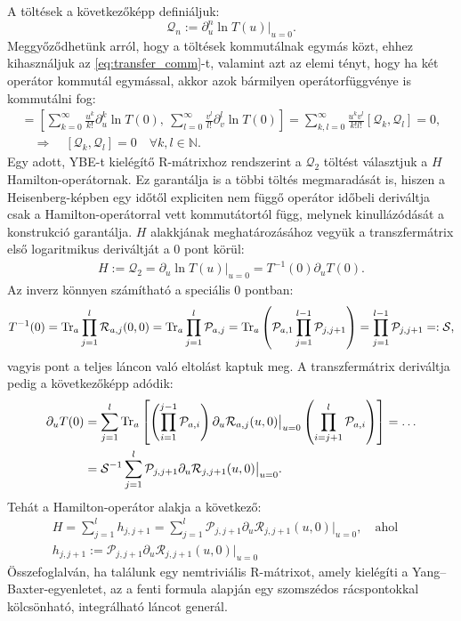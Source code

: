 \documentclass[12pt,a4paper,oneside]{report}
\newcommand{\R}{\mathcal{R}}
\renewcommand{\P}{\mathcal{P}}
\newcommand{\Q}{\mathcal{Q}}
\newcommand{\N}{\mathbb{N}}
\newcommand{\ahol}{\quad \text{ahol} \quad}
\newcommand{\kov}{\quad \Rightarrow \quad}
\begin{document}
A töltések a következőképp definiáljuk:
\begin{equation}\label{eq:charges}
    \Q_n:=\partial^n_u\ln T(u)\big|_{u=0}.
\end{equation}
Meggyőződhetünk arról, hogy a töltések kommutálnak egymás közt, ehhez kihasználjuk az \eqref{eq:transfer_comm}-t, valamint azt az elemi tényt, hogy ha két operátor kommutál egymással, akkor azok bármilyen operátorfüggvénye is kommutálni fog:
\begin{gather}
    [\ln T(u),\ \ln T(v)] = \left[\sum_{k=0}^\infty\frac{u^k}{k!}\partial_u^k\ln T(0),\ \sum_{l=0}^\infty\frac{v^l}{l!}\partial_v^l\ln T(0)\right]=\sum_{k,l=0}^\infty \frac{u^kv^l}{k!l!}\left[\Q_k, \Q_l\right]=0, \\
    \kov\left[\Q_k, \Q_l\right]=0 \quad \forall k,l\in \N.
\end{gather}
Egy adott, YBE-t kielégítő R-mátrixhoz rendszerint a $\Q_2$ töltést választjuk a $H$ Hamilton-operátornak. Ez garantálja is a többi töltés megmaradását is, hiszen a Heisenberg-képben egy időtől expliciten nem függő operátor időbeli deriváltja csak a Hamilton-operátorral vett kommutátortól függ, melynek kinullázódását a konstrukció garantálja. $H$ alakkjának meghatározásához vegyük a transzfermátrix első logaritmikus deriváltját a 0 pont körül:
\begin{gather}
    H:=\Q_2=\partial_u\ln T(u) \big|_{u=0}=T^{-1}(0)\partial_uT(0).
\end{gather}
Az inverz könnyen számítható a speciális 0 pontban:
\begin{equation}\label{eq:T_inverz}
    T^{-1}(0)=\Tr_a\prod_{j=1}^l\R_{a,j}(0,0)=\Tr_a\prod_{j=1}^l\P_{a,j}=\Tr_a\left(\P_{a,1}\prod_{j=1}^{l-1}\P_{j,j+1}\right)=\prod_{j=1}^{l-1}\P_{j,j+1}=:\mathcal{S},
\end{equation}
vagyis pont a teljes láncon való eltolást kaptuk meg. A transzfermátrix deriváltja pedig a következőképp adódik:
\begin{align}
    \partial_u T(0)&=\sum_{j=1}^l\Tr_a\left[\left(\prod_{i=1}^{j-1}\P_{a,i}\right)\partial_u\R_{a,j}(u,0)\big|_{u=0}\left(\prod_{i=j+1}^{l}\P_{a,i}\right)\right]=\dots \\
    &=\mathcal{S}^{-1}\sum_{j=1}^l\P_{j,j+1}\partial_u\R_{j,j+1}(u,0)\big|_{u=0}.
\end{align}
Tehát a Hamilton-operátor alakja a következő:
\begin{gather}\label{eq:H_dens}
    H=\sum_{j=1}^lh_{j,j+1}=\sum_{j=1}^l\P_{j,j+1}\partial_u\R_{j,j+1}(u,0)\big|_{u=0},\ahol \\
    h_{j,j+1}:=\P_{j,j+1}\partial_u\R_{j,j+1}(u,0)\big|_{u=0}
\end{gather}
Összefoglalván, ha találunk egy nemtriviális R-mátrixot, amely kielégíti a Yang--Baxter-egyenletet, az a fenti formula alapján egy szomszédos rácspontokkal kölcsönható, integrálható láncot generál.
\end{document}
